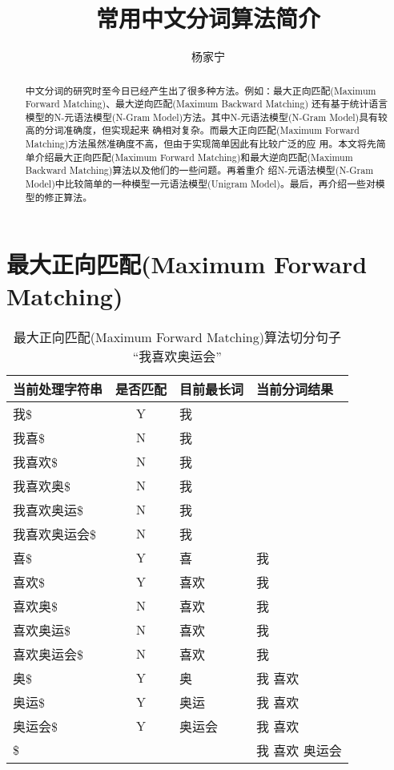 \documentclass[11pt,a4paper]{article}
\title{常用中文分词算法简介}
\author{杨家宁}
\def\maxforward{最大正向匹配(Maximum Forward Matching)}
\def\maxbackward{最大逆向匹配(Maximum Backward Matching)}
\def\NGram{N-元语法模型(N-Gram Model)}
\def\UniGram{一元语法模型(Unigram Model)}
\begin{document}
\maketitle

\def\abstractname{\bf 摘 要}
\begin{abstract}
中文分词的研究时至今日已经产生出了很多种方法。例如：\maxforward 、\maxbackward
还有基于统计语言模型的\NGram 方法。其中\NGram 具有较高的分词准确度，但实现起来
确相对复杂。而\maxforward 方法虽然准确度不高，但由于实现简单因此有比较广泛的应
用。本文将先简单介绍\maxforward 和\maxbackward 算法以及他们的一些问题。再着重介
绍\NGram 中比较简单的一种模型\UniGram 。最后，再介绍一些对模型的修正算法。
\end{abstract}

\section{\maxforward}
\begin{table}
\caption{\maxforward 算法切分句子 “我喜欢奥运会”}
\label{tbl_maxforward}
	\begin{center}
		\begin{tabular}{l|c|l|l}
			当前处理字符串 & 是否匹配    & 目前最长词 & 当前分词结果   \\
			\hline
			我\$           &  Y  & 我         &                \\
			我喜\$         &  N  & 我         &                \\
			我喜欢\$       &  N  & 我         &                \\
			我喜欢奥\$     &  N  & 我         &                \\
			我喜欢奥运\$   &  N  & 我         &                \\
			我喜欢奥运会\$ &  N  & 我         &                \\
			喜\$           &  Y  & 喜         & 我             \\ 
			喜欢\$         &  Y  & 喜欢       & 我             \\ 
			喜欢奥\$       &  N  & 喜欢       & 我             \\ 
			喜欢奥运\$     &  N  & 喜欢       & 我             \\ 
			喜欢奥运会\$   &  N  & 喜欢       & 我             \\ 
			奥\$           &  Y  & 奥         & 我 喜欢        \\ 
			奥运\$         &  Y  & 奥运       & 我 喜欢        \\ 
			奥运会\$       &  Y  & 奥运会     & 我 喜欢        \\ 
		    \$             &          &            & 我 喜欢 奥运会 \\
		\end{tabular}
	\end{center}
\end{table}
\end{document}
